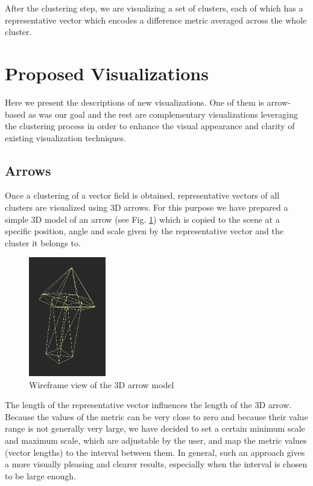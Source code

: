 After the clustering step, we are visualizing a set of clusters, each of which has a representative vector which encodes a difference metric averaged across the whole cluster.
\section{Proposed Visualizations}
\label{sec:analysis_visualizations}

Here we present the descriptions of new visualizations. One of them is arrow-based as was our goal and the rest are complementary visualizations leveraging the clustering process in order to enhance the visual appearance and clarity of existing visualization techniques.

\subsection{Arrows}
\label{sec:arrow_vis}

Once a clustering of a vector field is obtained, representative vectors of all clusters are visualized using 3D arrows. For this purpose we have prepared a simple 3D model of an arrow (see Fig. \ref{fig:arrow_model}) which is copied to the scene at a specific position, angle and scale given by the representative vector and the cluster it belongs to.

\begin{figure}[h]
\centering
\includegraphics[width=0.3\textwidth]{./img/8sided_arrow.PNG}
\caption[Arrow Model]{Wireframe view of the 3D arrow model}
\label{fig:arrow_model}
\end{figure}

The length of the representative vector influences the length of the 3D arrow. Because the values of the metric can be very close to zero and because their value range is not generally very large, we have decided to set a certain minimum scale and maximum scale, which are adjustable by the user, and map the metric values (vector lengths) to the interval between them. In general, such an approach gives a more visually pleasing and clearer results, especially when the interval is chosen to be large enough.

